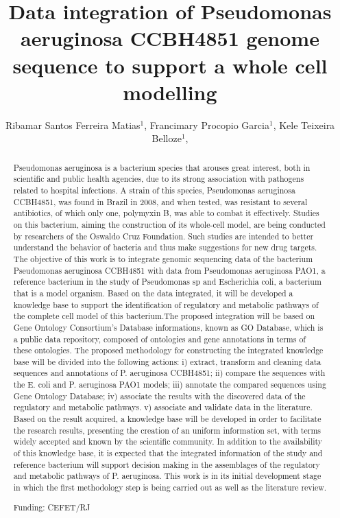 \documentclass[twoside]{article}
\title{\vspace{-15mm}\fontsize{24pt}{10pt}\selectfont\textbf{ Data integration of Pseudomonas aeruginosa CCBH4851 genome sequence to support a whole cell modelling }} %
\author{ Ribamar Santos Ferreira Matias$^{1}$, Francimary Procopio Garcia$^{1}$, Kele Teixeira Belloze$^{1}$, }
\affil{ 1 CEFET/RJ

 }
\date{}
\begin{document}
  
  
  \maketitle %
  
  
  \thispagestyle{fancy} %
  
  
  \begin{abstract}
  Pseudomonas aeruginosa is a bacterium species that arouses great interest, both in scientific and public health agencies, due to its strong association with pathogens related to hospital infections. A strain of this species, Pseudomonas aeruginosa CCBH4851, was found in Brazil in 2008, and when tested, was resistant to several antibiotics, of which only one, polymyxin B, was able to combat it effectively. Studies on this bacterium, aiming the construction of its whole-cell model, are being conducted by researchers of the Oswaldo Cruz Foundation. Such studies are intended to better understand the behavior of bacteria and thus make suggestions for new drug targets. The objective of this work is to integrate genomic sequencing data of the bacterium Pseudomonas aeruginosa CCBH4851 with data from Pseudomonas aeruginosa PAO1, a reference bacterium in the study of Pseudomonas sp and Escherichia coli, a bacterium that is a model organism. Based on the data integrated, it will be developed a knowledge base to support the identification of regulatory and metabolic pathways of the complete cell model of this bacterium.The proposed integration will be based on Gene Ontology Consortium’s Database informations, known as GO Database, which is a public data repository, composed of ontologies and gene annotations in terms of these ontologies. The proposed methodology for constructing the integrated knowledge base will be divided into the following actions: i) extract, transform and cleaning data sequences and annotations of P. aeruginosa CCBH4851; ii) compare the sequences with the E. coli and P. aeruginosa PAO1 models; iii) annotate the compared sequences using Gene Ontology Database; iv) associate the results with the discovered data of the regulatory and metabolic pathways. v) associate and validate data in the literature. Based on the result acquired, a knowledge base will be developed in order to facilitate the research results, presenting the creation of an uniform information set, with terms widely accepted and known by the scientific community. In addition to the availability of this knowledge base, it is expected that the integrated information of the study and reference bacterium will support decision making in the assemblages of the regulatory and metabolic pathways of P. aeruginosa. This work is in its initial development stage in which the first methodology step is being carried out as well as the literature review.
  
  Funding: CEFET/RJ \\ 
  \end{abstract}
  
\end{document}
